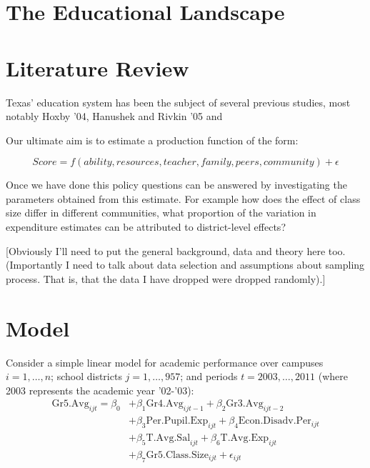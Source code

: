 \documentclass[11pt]{article}
\begin{document}
\section{The Educational Landscape}
\label{s:next}




\section{Literature Review}
\label{s:next2}

Texas' education system has been the subject of several previous studies, most notably Hoxby '04, Hanushek and Rivkin '05 and 



Our ultimate aim is to estimate a production function of the form:

$$Score = f(ability,resources,teacher,family,peers,community) + \epsilon$$

Once we have done this policy questions can be answered by investigating the parameters obtained from this estimate. For example how does the effect of class size differ in different communities, what proportion of the variation in expenditure estimates can be attributed to district-level effects?

[Obviously I'll need to put the general background, data and theory here too. (Importantly I need to talk about data selection and assumptions about sampling process. That is, that the data I have dropped were dropped randomly).]

\section{Model}
\label{s:next1}


Consider a simple linear model for academic performance over campuses $i=1,\ldots,n$; school districts $j=1,\ldots,957$; and periods $t=2003,\ldots,2011$ (where 2003 represents the academic year '02-'03):
\begin{align*}
\mathrm{Gr5.Avg}_{ijt} = \beta_{0} 
    &+ \beta_{1}  \mathrm{Gr4.Avg}_{ijt-1} 
    + \beta_{2}  \mathrm{Gr3.Avg}_{ijt-2}    \\
    &+ \beta_{3}  \mathrm{Per.Pupil.Exp}_{ijt} 
    + \beta_{4}  \mathrm{Econ.Disadv.Per}_{ijt} \\
    &+ \beta_{5}  \mathrm{T.Avg.Sal}_{ijt}   
    + \beta_{6}  \mathrm{T.Avg.Exp}_{ijt}  \\
    &+ \beta_{7}  \mathrm{Gr5.Class.Size}_{ijt} + \epsilon_{ijt}
\end{align*}
\end{document}
